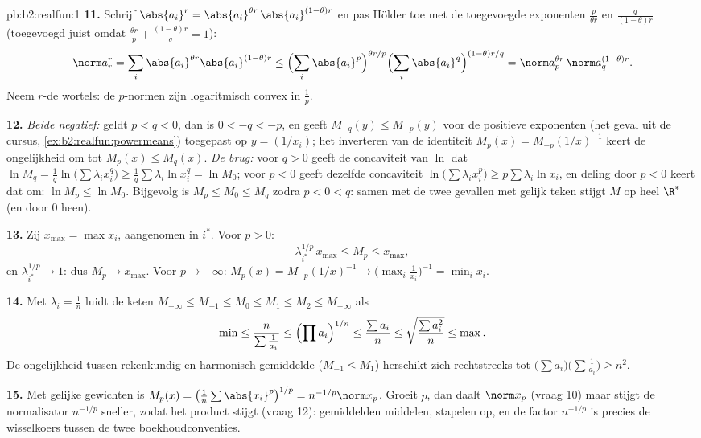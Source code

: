 \begin{solution}{pb:b2:realfun:1}
\textbf{11.} Schrijf $\abs{a_i}^r = \abs{a_i}^{\theta
r}\,\abs{a_i}^{(1-\theta)r}$ en pas Hölder toe met de toegevoegde
exponenten $\frac{p}{\theta r}$ en $\frac{q}{(1-\theta)r}$
(toegevoegd juist omdat $\frac{\theta r}p + \frac{(1-\theta)r}q =
1$):
\[
\norm a_r^r = \sum_i \abs{a_i}^{\theta r}\abs{a_i}^{(1-\theta)r}
\leq \Bigl(\sum_i\abs{a_i}^{p}\Bigr)^{\theta r/p}
\Bigl(\sum_i\abs{a_i}^{q}\Bigr)^{(1-\theta)r/q}
= \norm a_p^{\theta r}\,\norm a_q^{(1-\theta)r} .
\]
Neem $r$-de wortels: de $p$-normen zijn logaritmisch convex in
$\frac1p$.

\textbf{12.} \emph{Beide negatief:} geldt $p < q < 0$, dan is $0 <
-q < -p$, en geeft $M_{-q}(y) \leq M_{-p}(y)$ voor de positieve
exponenten (het geval uit de cursus,
\cref{ex:b2:realfun:powermeans}) toegepast op $y = (1/x_i)$; het
inverteren van de identiteit $M_p(x) = M_{-p}(1/x)^{-1}$ keert de
ongelijkheid om tot $M_p(x) \leq M_q(x)$. \emph{De brug:} voor $q >
0$ geeft de concaviteit van $\ln$ dat $\ln M_q =
\frac1q\ln\bigl(\sum\lambda_ix_i^q\bigr) \geq
\frac1q\sum\lambda_i\ln x_i^q = \ln M_0$; voor $p < 0$ geeft
dezelfde concaviteit $\ln\bigl(\sum\lambda_ix_i^p\bigr) \geq
p\sum\lambda_i\ln x_i$, en deling door $p < 0$ keert dat om: $\ln
M_p \leq \ln M_0$. Bijgevolg is $M_p \leq M_0 \leq M_q$ zodra $p <
0 < q$: samen met de twee gevallen met gelijk teken stijgt $M$ op
heel $\R^*$ (en door $0$ heen).

\textbf{13.} Zij $x_{\max} = \max x_i$, aangenomen in $i^*$. Voor
$p > 0$:
\[
\lambda_{i^*}^{1/p}\,x_{\max} \leq M_p \leq x_{\max},
\]
en $\lambda_{i^*}^{1/p} \to 1$: dus $M_p \to x_{\max}$. Voor $p \to
-\infty$: $M_p(x) = M_{-p}(1/x)^{-1} \to
\bigl(\max_i\frac1{x_i}\bigr)^{-1} = \min_ix_i$.

\textbf{14.} Met $\lambda_i = \frac1n$ luidt de keten $M_{-\infty}
\leq M_{-1} \leq M_0 \leq M_1 \leq M_2 \leq M_{+\infty}$ als
\[
\min \leq \frac{n}{\sum\frac1{a_i}} \leq \Bigl(\prod
a_i\Bigr)^{1/n} \leq \frac{\sum a_i}{n} \leq
\sqrt{\frac{\sum a_i^2}{n}} \leq \max .
\]
De ongelijkheid tussen rekenkundig en harmonisch gemiddelde
($M_{-1} \leq M_1$) herschikt zich rechtstreeks tot $\bigl(\sum
a_i\bigr)\bigl(\sum\frac1{a_i}\bigr) \geq n^2$.

\textbf{15.} Met gelijke gewichten is $M_p(x) =
\bigl(\frac1n\sum\abs{x_i}^p\bigr)^{1/p} = n^{-1/p}\norm x_p$.
Groeit $p$, dan daalt $\norm x_p$ (vraag 10) maar stijgt de
normalisator $n^{-1/p}$ sneller, zodat het product stijgt (vraag
12): gemiddelden middelen,  stapelen op, en de factor
$n^{-1/p}$ is precies de wisselkoers tussen de twee
boekhoudconventies.


\end{solution}
